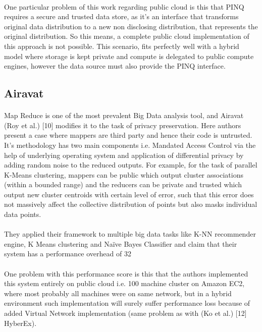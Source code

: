 \documentclass{report}
\begin{document}
\paragraph{}
One particular problem of this work regarding public cloud is this that PINQ requires a secure and trusted data store, as it’s an interface that transforms original data distribution to a new non disclosing distribution, that represents the original distribution. So this means, a complete public cloud implementation of this approach is not possible. This scenario, fits perfectly well with a hybrid model where storage is kept private and compute is delegated to public compute engines, however the data source must also provide the PINQ interface.
\subsection{Airavat}
\paragraph{}
Map Reduce is one of the most prevalent Big Data analysis tool, and Airavat (Roy et al.) [10] modifies it to the task of privacy preservation. Here authors present a case where mappers are third party and hence their code is untrusted. It's methodology has two main components i.e. Mandated Access Control via the help of underlying operating system and application of differential privacy by adding random noise to the reduced outputs. For example, for the task of parallel K-Means clustering, mappers can be public which output cluster associations (within a bounded range) and the reducers can be private and trusted which output new cluster centroids with certain level of error, such that this error does not massively affect the collective distribution of points but also masks individual data points.
\paragraph{}
They applied their framework to multiple big data tasks like K-NN recommender engine, K Means clustering and Naïve Bayes Classifier and claim that their system has a performance overhead of 32%
\paragraph{}
One problem with this performance score is this that the authors implemented this system entirely on public cloud i.e. 100 machine cluster on Amazon EC2, where most probably all machines were on same network, but in a hybrid environment such implementation will surely suffer performance loss because of added Virtual Network implementation (same problem as with (Ko et al.) [12] HyberEx).
\end{document}
